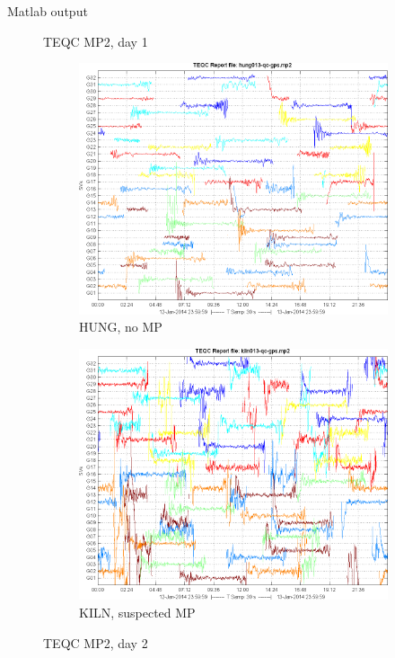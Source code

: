 \documentclass[11pt]{beamer}
\begin{document}
\begin{frame}[allowframebreaks]{Matlab output}
\begin{figure}
\begin{subfigure}{.5\textwidth}
		\end{subfigure}
		\caption{TEQC MP2, day 1}
	\end{figure}
	\begin{figure}
		\centering
		\begin{subfigure}{.5\textwidth}
			\centering
			\includegraphics[width=\textwidth]{pic/hung013_qc_gps_mp2.png}
			\caption{HUNG, no MP}
		\end{subfigure}%
		\begin{subfigure}{.5\textwidth}
			\centering
			\includegraphics[width=\textwidth]{pic/kiln013_qc_gps_mp2.png}
			\caption{KILN, suspected MP}
		\end{subfigure}
		\caption{TEQC MP2, day 2}
	\end{figure}
\end{frame}
\end{document}
